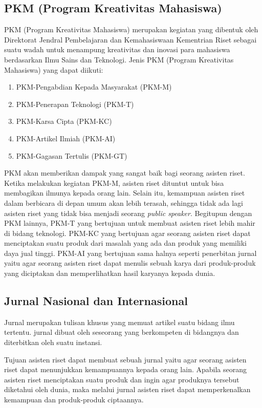 \subsection{PKM (Program Kreativitas Mahasiswa)}
\par
PKM (Program Kreativitas Mahasiswa) merupakan kegiatan yang dibentuk oleh Direktorat Jendral Pembelajaran dan Kemahasiswaan Kementrian Riset sebagai suatu wadah untuk menampung kreativitas dan inovasi para mahasiswa berdasarkan Ilmu Sains dan Teknologi.
Jenis PKM (Program Kreativitas Mahasiswa) yang dapat diikuti:
\begin{enumerate}
 \item PKM-Pengabdian Kepada Masyarakat (PKM-M)
 \item PKM-Penerapan Teknologi (PKM-T)
 \item PKM-Karsa Cipta (PKM-KC)
 \item PKM-Artikel Ilmiah (PKM-AI)
 \item PKM-Gagasan Tertulis (PKM-GT)
\end{enumerate}
\par
PKM akan memberikan dampak yang sangat baik bagi seorang asisten riset. Ketika melakukan kegiatan PKM-M, asisten riset dituntut untuk bisa membagikan ilmunya kepada orang lain. Selain itu, kemampuan asisten riset dalam berbicara di depan umum akan lebih terasah, sehingga tidak ada lagi asisten riset yang tidak bisa menjadi seorang \textit{public speaker}. Begitupun dengan PKM lainnya, PKM-T yang bertujuan untuk membuat asisten riset lebih mahir di bidang teknologi. PKM-KC yang bertujuan agar seorang asisten riset dapat menciptakan suatu produk dari masalah yang ada dan produk yang memiliki daya jual tinggi. PKM-AI yang bertujuan sama halnya seperti penerbitan jurnal yaitu agar seorang asisten riset dapat menulis sebuah karya dari produk-produk yang diciptakan dan memperlihatkan hasil karyanya kepada dunia.

\subsection{Jurnal Nasional dan Internasional}
\par
Jurnal merupakan tulisan khusus yang memuat artikel suatu bidang ilmu tertentu. jurnal dibuat oleh seseorang yang berkompeten di bidangnya dan diterbitkan oleh suatu instansi.\\
\par
Tujuan asisten riset dapat membuat sebuah jurnal yaitu agar seorang asisten riset dapat menunjukkan kemampuannya kepada orang lain. Apabila seorang asisten riset menciptakan suatu produk dan ingin agar produknya tersebut diketahui oleh dunia, maka melalui jurnal asisten riset dapat memperkenalkan kemampuan dan produk-produk ciptaannya.

